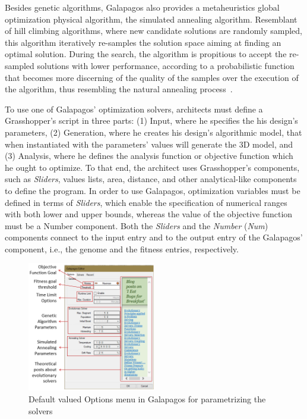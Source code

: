 	Besides genetic algorithms, Galapagos also provides a metaheuristics global optimization physical algorithm, the simulated annealing algorithm. Resemblant of hill climbing algorithms, where new candidate solutions are randomly sampled, this algorithm iteratively re-samples the solution space aiming at finding an optimal solution. During the search, the algorithm is propitious to accept the re-sampled solutions with lower performance, according to a probabilistic function that becomes more discerning of the quality of the samples over the execution of the algorithm, thus resembling the natural annealing process~\cite{Brownlee2011}. 

	To use one of Galapagos' optimization solvers, architects must define a Grasshopper's script in three parts: (1) Input, where he specifies the his design's parameters, (2) Generation, where he creates his design's algorithmic model, that when instantiated with the parameters' values will generate the 3D model, and (3) Analysis, where he defines the analysis function or objective function which he ought to optimize. To that end, the architect uses Grasshopper's components, such as \textit{Sliders}, values lists, area, distance, and other analytical-like components to define the program. In order to use Galapagos, optimization variables must be defined in terms of \textit{Sliders}, which enable the specification of numerical ranges with both lower and upper bounds, whereas the value of the objective function must be a Number component. Both the \textit{Sliders} and the \textit{Number} (\textit{Num}) components connect to the input entry and to the output entry of the Galapagos' component, i.e., the genome and the fitness entries, respectively. 

\begin{figure}
\centering
\includegraphics[width=0.5\textwidth]{Images/Background/Galapagos/galapagos-options-menu.PNG}
\caption[Galapagos algorithm's configuration menu]{Default valued Options menu in Galapagos for parametrizing the solvers}
\label{fig:galapagossetup}
\end{figure}

